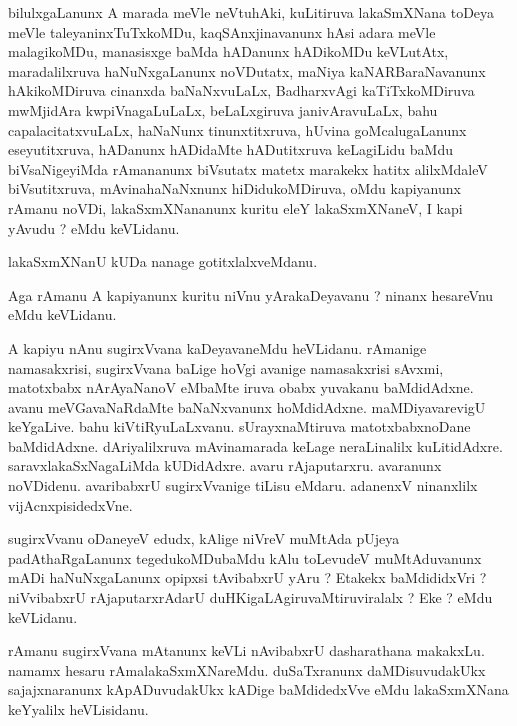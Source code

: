 \documentclass{article}
\begin{document}
\begin{mn}
bilulxgaLanunx  A  marada  meVle  neVtuhAki,  kuLitiruva  lakaSmXNana  toDeya  meVle  taleyaninxTuTxkoMDu,  kaqSAnxjinavanunx  
hAsi  adara  meVle  malagikoMDu,  manasisxge  baMda  hADanunx  hADikoMDu  keVLutAtx,  maradalilxruva  haNuNxgaLanunx  noVDutatx,  
maNiya  kaNARBaraNavanunx  hAkikoMDiruva  cinanxda  baNaNxvuLaLx,  BadharxvAgi  kaTiTxkoMDiruva  mwMjidAra  kwpiVnagaLuLaLx,  
beLaLxgiruva  janivAravuLaLx,  bahu  capalacitatxvuLaLx,  haNaNunx  tinunxtitxruva,  hUvina  goMcalugaLanunx  eseyutitxruva,  
hADanunx  hADidaMte  hADutitxruva  keLagiLidu  baMdu  biVsaNigeyiMda  rAmananunx  biVsutatx  matetx  marakekx  hatitx  alilxMdaleV  
biVsutitxruva,  mAvinahaNaNxnunx  hiDidukoMDiruva,  oMdu  kapiyanunx  rAmanu  noVDi,  lakaSxmXNananunx  kuritu  eleY  lakaSxmXNaneV,  
I  kapi  yAvudu ?  eMdu  keVLidanu.
\end{mn}

\begin{mn}
lakaSxmXNanU  kUDa  nanage  gotitxlalxveMdanu.
\end{mn}

\begin{mn}
Aga  rAmanu  A  kapiyanunx  kuritu  niVnu  yArakaDeyavanu ?  ninanx  hesareVnu  eMdu  keVLidanu.
\end{mn}

\begin{mn}
A  kapiyu  nAnu  sugirxVvana  kaDeyavaneMdu  heVLidanu.  rAmanige  namasakxrisi,  sugirxVvana  baLige  hoVgi  avanige  namasakxrisi  
sAvxmi,  matotxbabx  nArAyaNanoV  eMbaMte  iruva  obabx  yuvakanu  baMdidAdxne.  avanu  meVGavaNaRdaMte  baNaNxvanunx  hoMdidAdxne.  
maMDiyavarevigU  keYgaLive.  bahu  kiVtiRyuLaLxvanu.  sUrayxnaMtiruva  matotxbabxnoDane  baMdidAdxne.  dAriyalilxruva  mAvinamarada   
keLage  neraLinalilx  kuLitidAdxre.  saravxlakaSxNagaLiMda  kUDidAdxre.  avaru  rAjaputarxru.  avaranunx  noVDidenu.  avaribabxrU  
sugirxVvanige  tiLisu  eMdaru.  adanenxV  ninanxlilx  vijAcnxpisidedxVne.
\end{mn}

\begin{mn}
sugirxVvanu  oDaneyeV  edudx,  kAlige  niVreV  muMtAda  pUjeya  padAthaRgaLanunx  tegedukoMDubaMdu  kAlu  toLevudeV  muMtAduvanunx  
mADi  haNuNxgaLanunx  opipxsi  tAvibabxrU  yAru ?  Etakekx  baMdididxVri ?  niVvibabxrU  rAjaputarxrAdarU  duHKigaLAgiruvaMtiruviralalx ?  
Eke ?  eMdu  keVLidanu.
\end{mn}

\begin{mn}
rAmanu  sugirxVvana  mAtanunx  keVLi  nAvibabxrU  dasharathana  makakxLu.  namamx  hesaru  rAmalakaSxmXNareMdu.  duSaTxranunx  
daMDisuvudakUkx  sajajxnaranunx  kApADuvudakUkx  kADige  baMdidedxVve  eMdu  lakaSxmXNana  keYyalilx  heVLisidanu.
\end{mn}
\end{document}
